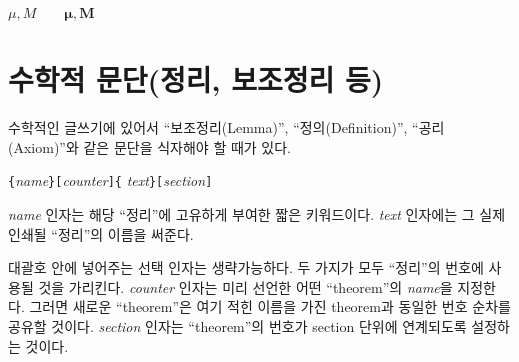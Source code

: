 \begin{example}
$\mu, M \qquad
\boldsymbol{\mu}, \boldsymbol{M}$
\end{example}

\section{수학적 문단(정리, 보조정리 등)}

수학적인 글쓰기에 있어서 ``보조정리(Lemma)'', ``정의(Definition)'', ``공리(Axiom)''와 같은 문단을 식자해야 할 때가 있다.
\begin{lscommand}
\verb|{|\emph{name}\verb|}[|\emph{counter}\verb|]{|%
         \emph{text}\verb|}[|\emph{section}\verb|]|
\end{lscommand}
\noindent \emph{name} 인자는 해당 ``정리''에 고유하게 부여한 짧은 키워드이다.
\emph{text} 인자에는 그 실제 인쇄될 ``정리''의 이름을 써준다.

대괄호 안에 넣어주는 선택 인자는 생략가능하다.
두 가지가 모두 ``정리''의 번호에 사용될 것을 가리킨다. \emph{counter} 인자는 미리 선언한 어떤 ``theorem''의 \emph{name}을 지정한다. 
그러면 새로운 ``theorem''은 여기 적힌 이름을 가진 theorem과 동일한 번호 순차를 공유할 것이다.
\emph{section} 인자는 ``theorem''의 번호가 section 단위에 연계되도록 
설정하는 것이다.

